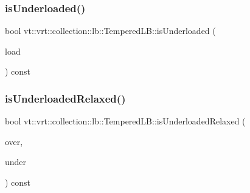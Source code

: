 \mbox{\label{structvt_1_1vrt_1_1collection_1_1lb_1_1_tempered_l_b_a499b448496764b6eb8c25f3dc8188e2c}} 
\subsubsection{\texorpdfstring{is\+Underloaded()}{isUnderloaded()}}
{\footnotesize\ttfamily bool vt\+::vrt\+::collection\+::lb\+::\+Tempered\+L\+B\+::is\+Underloaded (\begin{DoxyParamCaption}\item[{\hyperlink{structvt_1_1vrt_1_1collection_1_1lb_1_1_base_l_b_a215e22b9f12678303f49615ae3be05cc}{Load\+Type}}]{load }\end{DoxyParamCaption}) const\hspace{0.3cm}{\ttfamily [protected]}}

\mbox{\label{structvt_1_1vrt_1_1collection_1_1lb_1_1_tempered_l_b_a9a65a386b0dbd2006db3977ecf0efe79}} 
\subsubsection{\texorpdfstring{is\+Underloaded\+Relaxed()}{isUnderloadedRelaxed()}}
{\footnotesize\ttfamily bool vt\+::vrt\+::collection\+::lb\+::\+Tempered\+L\+B\+::is\+Underloaded\+Relaxed (\begin{DoxyParamCaption}\item[{\hyperlink{structvt_1_1vrt_1_1collection_1_1lb_1_1_base_l_b_a215e22b9f12678303f49615ae3be05cc}{Load\+Type}}]{over,  }\item[{\hyperlink{structvt_1_1vrt_1_1collection_1_1lb_1_1_base_l_b_a215e22b9f12678303f49615ae3be05cc}{Load\+Type}}]{under }\end{DoxyParamCaption}) const\hspace{0.3cm}{\ttfamily [protected]}}

